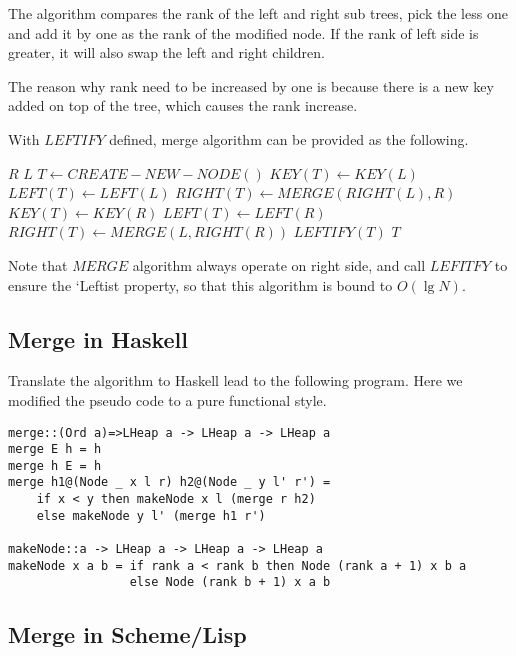 \documentclass{article}
\begin{document}
The algorithm compares the rank of the left and
right sub trees, pick the less one and add it by one as the
rank of the modified node. If the rank of left side is greater,
it will also swap the left and right children.

The reason why rank need to be increased by one is because there
is a new key added on top of the tree, which causes the rank
increase.

With $LEFTIFY$ defined, merge algorithm can be provided as the
following.

\begin{algorithmic}[1]
    \State \Return $R$
    \State \Return $L$
  \Else
    \State $T \gets CREATE-NEW-NODE()$
      \State $KEY(T) \gets KEY(L)$
      \State $LEFT(T) \gets LEFT(L)$
      \State $RIGHT(T) \gets MERGE(RIGHT(L), R)$
    \Else
      \State $KEY(T) \gets KEY(R)$
      \State $LEFT(T) \gets LEFT(R)$
      \State $RIGHT(T) \gets MERGE(L, RIGHT(R))$
    \EndIf
    \State $LEFTIFY(T)$
  \EndIf
  \State \Return $T$
\EndFunction
\end{algorithmic}

Note that $MERGE$ algorithm always operate on right side, and call
$LEFITFY$ to ensure the `Leftist property, so that this algorithm
is bound to $O(\lg N)$.

\subsection*{Merge in Haskell}

Translate the algorithm to Haskell lead to the following program.
Here we modified the pseudo code to a pure functional style.

\lstset{language=Haskell}
\begin{lstlisting}
merge::(Ord a)=>LHeap a -> LHeap a -> LHeap a
merge E h = h
merge h E = h
merge h1@(Node _ x l r) h2@(Node _ y l' r') =
    if x < y then makeNode x l (merge r h2)
    else makeNode y l' (merge h1 r')

makeNode::a -> LHeap a -> LHeap a -> LHeap a
makeNode x a b = if rank a < rank b then Node (rank a + 1) x b a
                 else Node (rank b + 1) x a b
\end{lstlisting}

\subsection*{Merge in Scheme/Lisp}
\end{document}

